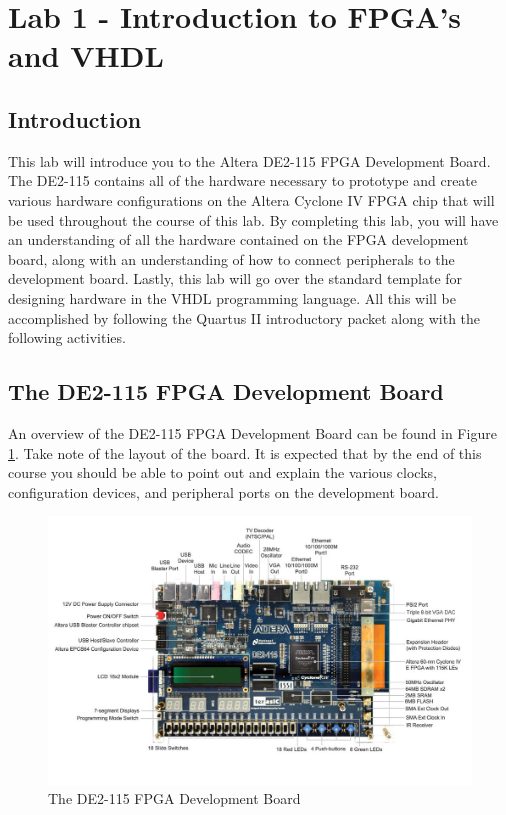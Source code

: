 \section{Lab 1 - Introduction to FPGA's and VHDL}

\subsection{Introduction}
This lab will introduce you to the Altera DE2-115 FPGA Development Board. The DE2-115 contains all of the hardware necessary to prototype and create various hardware configurations on the Altera Cyclone IV FPGA chip that will be used throughout the course of this lab. By completing this lab, you will have an understanding of all the hardware contained on the FPGA development board, along with an understanding of how to connect peripherals to the development board. Lastly, this lab will go over the standard template for designing hardware in the VHDL programming language. All this will be accomplished by following the Quartus II introductory packet along with the following activities.

\subsection{The DE2-115 FPGA Development Board}
An overview of the DE2-115 FPGA Development Board can be found in Figure \ref{fig:DE2-115}. Take note of the layout of the board. It is expected that by the end of this course you should be able to point out and explain the various clocks, configuration devices, and peripheral ports on the development board.

\begin{figure}[H]
	\centering
	\includegraphics[width=170mm]{Lab1/figures/DE2-115.jpg}
	\caption{The DE2-115 FPGA Development Board}
	\label{fig:DE2-115}
\end{figure}

